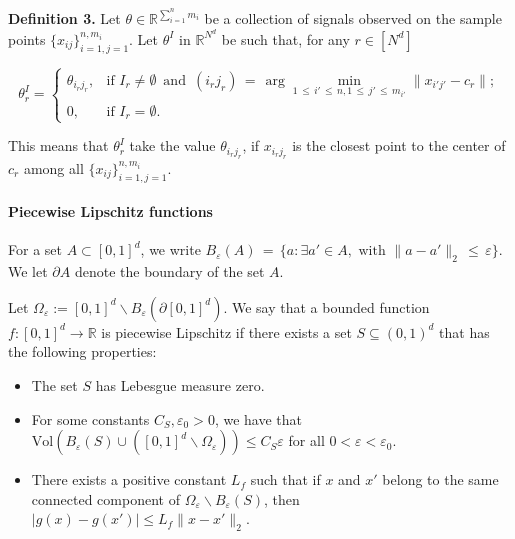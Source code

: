 \documentclass[twoside,11pt]{article}
\makeatletter
\newcommand{\discardlabel}[1]{}
\newcommand{\discardtwo}[2]{}
\newcommand{\legacyref}[1]{\textup{[source ref.]}}
\newcommand{\legacyeqref}[1]{\textup{[source equation]}}
\newenvironment{legacycomparison}{%
  \begingroup\color{legacygray}%
  \let\label\discardlabel
  \let\originallabel\discardlabel
  \let\ref\legacyref
  \let\pageref\legacyref
  \let\eqref\legacyeqref
  \let\cref\legacyref
  \let\Cref\legacyref
  \let\autoref\legacyref
  \let\aliasref\discardtwo
}{\endgroup}
\newcommand{\aliasref}[2]{%
  \@ifundefined{r@#2}{}{%
    \expandafter\let\csname r@#1\expandafter\endcsname\csname r@#2\endcsname}}
\makeatother
\begin{document}
\begin{legacycomparison}
\textbf{Definition 3.} Let \(\theta \in \mathbb{R}^{\sum_{i=1}^n m_i}\) be a collection of signals observed on the sample points \(\{x_{ij}\}^{n,m_i}_{i=1,j=1}\). Let \(\theta^I\) in \(\mathbb{R}^{N^d}\) be such that, for any \(r \in [N^d]\)

\[
\theta^I_r = 
\begin{cases} 
\theta_{i_rj_r}, & \text{if } I_r \neq \emptyset \,\,\,\text{and}\,\,\, (i_rj_r) \,=\, \arg\min_{1 \,\leq\, i' \,\leq\, n, 1 \,\leq\, j' \,\leq\, m_{i'}}\|x_{i'j'} - c_r\|; \\
0, & \text{if } I_r = \emptyset.
\end{cases}
\]

This means that \(\theta^I_r\) take the value \(\theta_{i_rj_r}\), if \(x_{i_rj_r}\) is the closest point to the center of \(c_r\) among all \(\{x_{ij}\}^{n,m_i}_{i=1,j=1}\).

\paragraph{Piecewise Lipschitz functions}
\label{plf_notation}

\begin{definition}
\label{def_S}
    For a set \( A \subset [0,1]^d \), we write \( B_{\varepsilon}(A) \,=\, \{a : \exists a' \in A, \text{ with } \|a - a'\|_2 \,\leq\, \varepsilon\} \). We let \( \partial A \) denote the boundary of the set \( A \).

Let \( \Omega_{\varepsilon} := [0,1]^d \backslash B_{\varepsilon}(\partial[0,1]^d) \). We say that a bounded function \( f : [0,1]^d \rightarrow \mathbb{R} \) is piecewise Lipschitz if there exists a set \( S \subseteq (0,1)^d \) that has the following properties:

\begin{itemize}
  \item The set \( S \) has Lebesgue measure zero.
  \item For some constants \( C_S, \varepsilon_0 > 0 \), we have that \( \text{Vol} (B_{\varepsilon}(S) \cup ([0,1]^d \backslash \Omega_{\varepsilon})) \leq  C_S\varepsilon \) for all \( 0 < \varepsilon < \varepsilon_0 \).
  \item There exists a positive constant \( L_f \) such that if \( x \) and \( x' \) belong to the same connected component of \( \Omega_{\varepsilon} \backslash B_{\varepsilon}(S) \), then \( |g(x) - g(x')| \leq  L_f \|x - x'\|_2 \).
\end{itemize}

\end{definition}





\end{legacycomparison}
\end{document}
